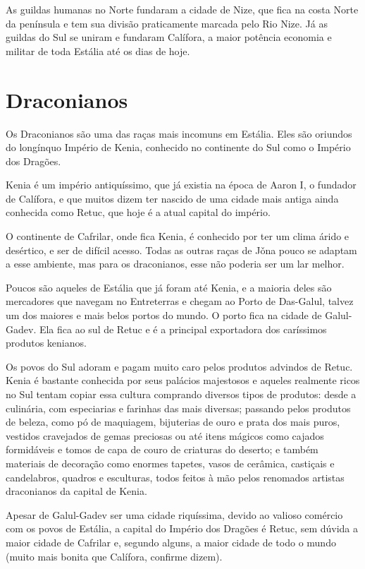 \documentclass{RPG_Adventure}[2021/10/20]
\begin{document}
\begin{multicols}{2}
As guildas humanas no Norte fundaram a cidade de Nize, que fica na costa Norte
da península e tem sua divisão praticamente marcada pelo Rio Nize. Já as guildas
do Sul se uniram e fundaram Calífora, a maior potência economia e militar de
toda Estália até os dias de hoje.


\section{Draconianos}%

Os Draconianos são uma das raças mais incomuns em Estália. Eles são oriundos do
longínquo Império de Kenia, conhecido no continente do Sul como o Império dos
Dragões.

Kenia é um império antiquíssimo, que já existia na época de Aaron I, o fundador
de Calífora, e que muitos dizem ter nascido de uma cidade mais antiga ainda
conhecida como Retuc, que hoje é a atual capital do império.

O continente de Cafrilar, onde fica Kenia, é conhecido por ter um clima árido e
desértico, e ser de difícil acesso. Todas as outras raças de Jǒna pouco se
adaptam a esse ambiente, mas para os draconianos, esse não poderia ser um lar
melhor.

Poucos são aqueles de Estália que já foram até Kenia, e a maioria deles são
mercadores que navegam no Entreterras e chegam ao Porto de Das-Galul, talvez um
dos maiores e mais belos portos do mundo. O porto fica na cidade de Galul-Gadev.
Ela fica ao sul de Retuc e é a principal exportadora dos caríssimos produtos
kenianos.

Os povos do Sul adoram e pagam muito caro pelos produtos advindos de Retuc.
Kenia é bastante conhecida por seus palácios majestosos e aqueles realmente
ricos no Sul tentam copiar essa cultura comprando diversos tipos de produtos:
desde a culinária, com especiarias e farinhas das mais diversas; passando pelos
produtos de beleza, como pó de maquiagem, bijuterias de ouro e prata dos mais
puros, vestidos cravejados de gemas preciosas ou até itens mágicos como cajados
formidáveis e tomos de capa de couro de criaturas do deserto; e também materiais
de decoração como enormes tapetes, vasos de cerâmica, castiçais e candelabros,
quadros e esculturas, todos feitos à mão pelos renomados artistas draconianos da
capital de Kenia.

Apesar de Galul-Gadev ser uma cidade riquíssima, devido ao valioso comércio com
os povos de Estália, a capital do Império dos Dragões é Retuc, sem dúvida a
maior cidade de Cafrilar e, segundo alguns, a maior cidade de todo o mundo
(muito mais bonita que Calífora, confirme dizem).


\end{multicols}
\end{document}
